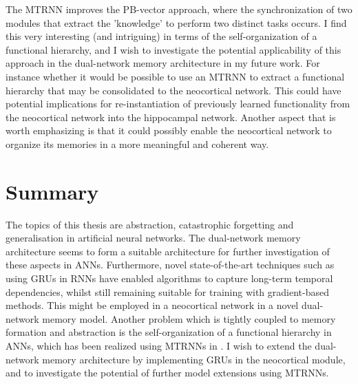 The MTRNN improves the PB-vector approach, where the synchronization of two modules that extract the 'knowledge' to perform two distinct tasks occurs. I find this very interesting (and intriguing) in terms of the self-organization of a functional hierarchy, and I wish to investigate the potential applicability of this approach in the dual-network memory architecture in my future work. For instance whether it would be possible to use an MTRNN to extract a functional hierarchy that may be consolidated to the neocortical network. This could have potential implications for re-instantiation of previously learned functionality from the neocortical network into the hippocampal network. Another aspect that is worth emphasizing is that it could possibly enable the neocortical network to organize its memories in a more meaningful and coherent way.

\section{Summary}

The topics of this thesis are abstraction, catastrophic forgetting and generalisation in artificial neural networks. The dual-network memory architecture \citep{McClelland1995, French1997, Ans1997, Hattori2014} seems to form a suitable architecture for further investigation of these aspects in ANNs. Furthermore, novel state-of-the-art techniques such as using GRUs in RNNs have enabled algorithms to capture long-term temporal dependencies, whilst still remaining suitable for training with gradient-based methods. This might be employed in a neocortical network in a novel dual-network memory model. Another problem which is tightly coupled to memory formation and abstraction is the self-organization of a functional hierarchy in ANNs, which has been realized using MTRNNs in \citep{Yamashita2008, Tani2014}. I wish to extend the dual-network memory architecture by implementing GRUs in the neocortical module, and to investigate the potential of further model extensions using MTRNNs.


\cleardoublepage